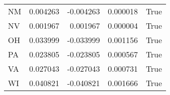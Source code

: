 \begin{table}
\begin{tabular}{lrrrl}
      NM &   0.004263 & -0.004263 &       0.000018 &          True \\
      NV &   0.001967 &  0.001967 &       0.000004 &          True \\
      OH &   0.033999 & -0.033999 &       0.001156 &          True \\
      PA &   0.023805 & -0.023805 &       0.000567 &          True \\
      VA &   0.027043 & -0.027043 &       0.000731 &          True \\
      WI &   0.040821 & -0.040821 &       0.001666 &          True \\
\bottomrule
\end{tabular}
\end{table}
